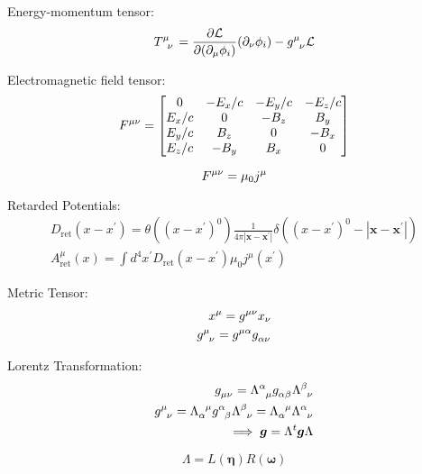 \documentclass[a4paper, twocolumn]{article}
\renewcommand{\vec}[1]{\boldsymbol{#1}}
\begin{document}
Energy-momentum tensor:
\begin{equation*}
    \tensor{T}{^\mu_\nu} = \frac{\partial \mathcal{L}}{\partial (\partial_{\mu} \phi_{i})} (\partial_{\nu} \phi_{i}) - \tensor{g}{^{\mu}_{\nu}} \mathcal{L}
\end{equation*}

Electromagnetic field tensor:
\begin{equation*}
    \tensor{F}{^\mu^\nu} = \begin{bmatrix}
      0     &  - E_x/c & - E_y/c &  - E_z/c \\
     E_x/c &  0     & -B_z   &  B_y    \\
     E_y/c &  B_z   &  0     & -B_x   \\
     E_z/c & -B_y   &  B_x   &  0
  \end{bmatrix}
\end{equation*}

\begin{equation*}
    \tensor{F}{^\mu^\nu} = \mu_0 j^{\mu}
\end{equation*}

Retarded Potentials:
\begin{align*}
    D_{\text{ret}}(x-x^{\prime}) = \theta((x-x^{\prime})^{0}) \frac{1}{4 \pi | \vec{x} - \vec{x}^{\prime}|} \delta((x-x^{\prime})^{0} - | \vec{x} - \vec{x}^{\prime}|) \\
    A^{\mu}_{\text{ret}}(x) = \int d^4 x^{\prime} D_{\text{ret}}(x-x^{\prime}) \mu_0 j^{\mu}(x^{\prime})
\end{align*}

Metric Tensor:
\begin{align*}
    \tensor{x}{^\mu} = \tensor{g}{^\mu^{\nu}} x_{\nu} \\
    \tensor{g}{^\mu_\nu} = \tensor{g}{^\mu^\alpha} \tensor{g}{_\alpha_\nu}
\end{align*}

Lorentz Transformation:
\begin{align*}
    \tensor{g}{_\mu_\nu} = \tensor{\Lambda}{^\alpha_\mu} \tensor{g}{_\alpha_\beta} \tensor{\Lambda}{^\beta_\nu} \\
    \tensor{g}{^\mu_\nu} = \tensor{\Lambda}{_\alpha^\mu} \tensor{g}{^\alpha_\beta} \tensor{\Lambda}{^\beta_\nu} = \tensor{\Lambda}{_\alpha^\mu} \tensor{\Lambda}{^\alpha_\nu} \\
    \implies \vec{g} = \Lambda^{t} \vec{g} \Lambda
\end{align*}

\begin{equation*}
    \Lambda = L(\vec{\eta}) R(\vec{\omega})
\end{equation*}
\end{document}
